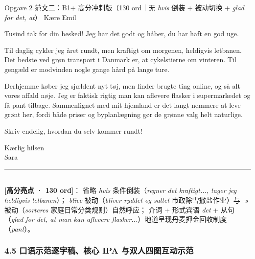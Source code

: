 \begin{emailbox}{Opgave 2 范文二：B1+ 高分冲刺版（130 ord｜无 \textit{hvis} 倒装 + 被动切换 + \textit{glad for det, at}）}
Kære Emil

\vspace{0.25em}
Tusind tak for din besked! Jeg har det godt og håber, du har haft en god uge.

\vspace{0.25em}
Til daglig cykler jeg året rundt, men  kraftigt om morgenen,  heldigvis letbanen. Det bedste ved grøn transport i Danmark er, at cykelstierne  om vinteren. Til gengæld er modvinden nogle gange hård på lange ture.

\vspace{0.25em}
Derhjemme køber jeg sjældent nyt tøj, men finder brugte ting online, og så  alt vores affald nøje. Jeg er faktisk rigtig  man kan aflevere flasker i supermarkedet og få pant tilbage. Sammenlignet med mit hjemland er det langt nemmere at leve grønt her, fordi både priser og byplanlægning gør de grønne valg helt naturlige.

\vspace{0.25em}
Skriv endelig, hvordan du selv kommer rundt!

\vspace{0.25em}
Kærlig hilsen\\
Sara

\vspace{0.3em}
\rule{\linewidth}{0.4pt}\\[0.2em]
\small\textbf{\color{NCDNavy}[高分亮点 · 130 ord]}： 省略 \textit{hvis} 条件倒装（\textit{regner det kraftigt..., tager jeg heldigvis letbanen}）； \textit{blive} 被动（\textit{bliver ryddet og saltet} 市政除雪撒盐作业）与 \textit{-s} 被动（\textit{sorteres} 家庭日常分类规则）自然呼应； 介词 + 形式宾语 \textit{det} + 从句（\textit{glad for det, at man kan aflevere flasker...}）地道呈现丹麦押金回收制度（\textit{pant}）。
\end{emailbox}

\subsubsection*{4.5 口语示范逐字稿、核心 IPA 与双人四图互动示范}

